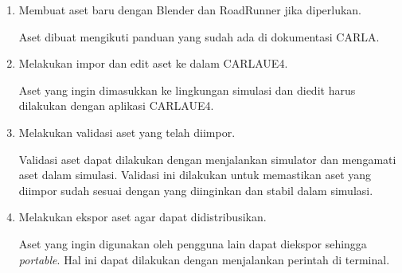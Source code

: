 \begin{enumerate}

	\item Membuat aset baru dengan Blender dan RoadRunner jika diperlukan.

	Aset dibuat mengikuti panduan yang sudah ada di dokumentasi CARLA.

	\item Melakukan impor dan edit aset ke dalam CARLAUE4.

	Aset yang ingin dimasukkan ke lingkungan simulasi dan diedit harus dilakukan
	dengan aplikasi CARLAUE4.



	\item Melakukan validasi aset yang telah diimpor.

	Validasi aset dapat dilakukan dengan menjalankan simulator dan mengamati
	aset dalam simulasi. Validasi ini dilakukan untuk memastikan aset yang
	diimpor sudah sesuai dengan yang diinginkan dan stabil dalam simulasi.

	\item Melakukan ekspor aset agar dapat didistribusikan.

	Aset yang ingin digunakan oleh pengguna lain dapat diekspor sehingga
	\textit{portable}. Hal ini dapat dilakukan dengan menjalankan perintah di
	terminal.

\end{enumerate}


